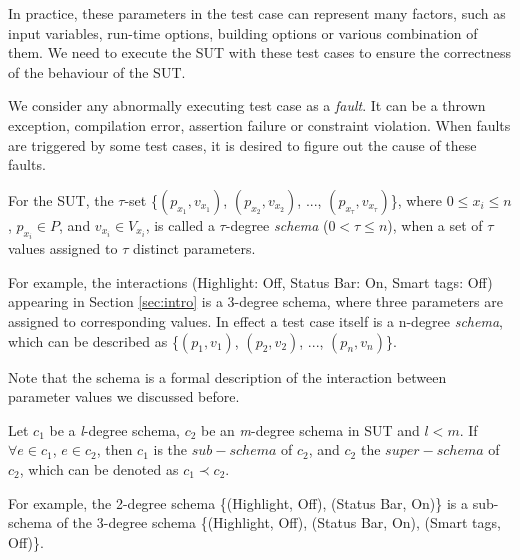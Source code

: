 In practice, these parameters in the test case can represent many factors, such as input variables, run-time options, building options or various combination of them. We need to execute the SUT with these test cases to ensure the correctness of the behaviour of the SUT.

We consider any abnormally executing test case as a \emph{fault}. It can be a thrown exception, compilation error, assertion failure or constraint violation. When faults are triggered by some test cases, it is desired to figure out the cause of these faults.


\begin{definition}\label{de:schema}
For the SUT, the $\tau$-set \{$(p_{x_{1}}, v_{x_{1}})$, $(p_{x_{2}}, v_{x_{2}})$, ..., $(p_{x_{\tau}}, v_{x_{\tau}})$\}, where $0 \leq x_{i} \leq n$, $p_{x_{i}} \in P$, and $v_{x_{i}} \in V_{x_{i}}$, is called a $\tau$-degree \emph{schema} ($0 < \tau \leq n $), when a set of $\tau$ values assigned to $\tau$ distinct parameters.

For example, the interactions (Highlight: Off, Status Bar: On, Smart tags: Off) appearing in Section \ref{sec:intro} is a 3-degree schema, where three parameters are assigned to corresponding values. In effect a test case itself is a n-degree \emph{schema}, which can be described as \{$(p_{1}, v_{1})$, $(p_{2}, v_{2})$, ..., $(p_{n}, v_{n})$\}.
\end{definition}
Note that the schema is a formal description of the interaction between parameter values we discussed before.

\begin{definition}\label{de:subsume}
Let $c_{1}$ be a \emph{l}-degree schema, $c_{2}$ be an \emph{m}-degree schema in SUT and $l < m$. If $\forall e \in c_{1}$, $e \in c_{2}$, then $c_{1}$ is the $sub-schema$ of $c_{2}$, and $c_{2}$ the $super-schema$ of $c_{2}$, which can be denoted as $c_{1} \prec c_{2}$.
\end{definition}

For example,  the 2-degree schema \{(Highlight, Off), (Status Bar, On)\} is a sub-schema of the 3-degree schema \{(Highlight, Off), (Status Bar, On), (Smart tags, Off)\}.

